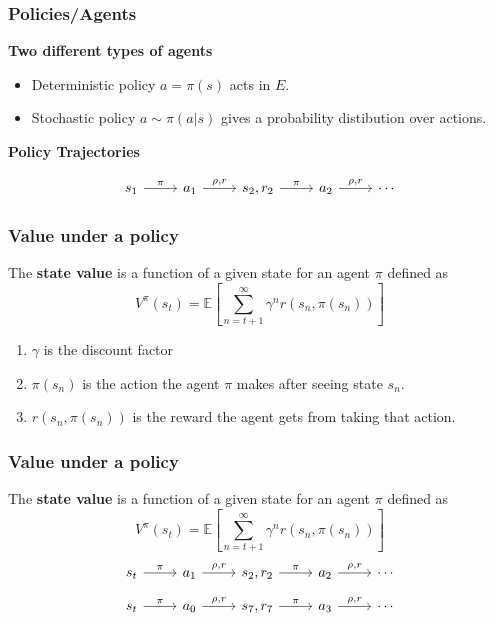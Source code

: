 \begin{frame}[fragile]
  \frametitle{Policies/Agents}
\textbf{Two different types of agents}
    \begin{itemize}
    \item Deterministic policy $a = \pi(s)$ acts in $E$. 
    \item Stochastic policy $a \sim \pi(a | s)$ gives a probability distibution over actions.
    \end{itemize}

\textbf{Policy Trajectories}
    
    \begin{equation*}
      \begin{tikzcd}
          s_1 \arrow{r}{\pi} & a_1 \arrow{r}{\rho, r} & s_2, r_2 \arrow{r}{\pi}& a_2  \arrow{r}{\rho, r} & \cdots
         \end{tikzcd}   
    \end{equation*}
\end{frame}




\begin{frame}
\frametitle{Value under a policy}
  The \textbf{state value} is a function of a given state for an agent $\pi$ defined as 
  \begin{equation*}
    V^\pi(s_t) = \mathbb{E}\left[\sum_{n={t+1}}^\infty \gamma^n r(s_n, \pi(s_n))\right]
  \end{equation*} 
  \begin{enumerate}
    \item $\gamma$ is the discount factor
    \item $\pi(s_n)$ is the action the agent $\pi$ makes after seeing state $s_n$.
    \item $r(s_n, \pi(s_n))$ is the reward the agent gets from taking that action.
  \end{enumerate}
\end{frame}


\begin{frame}[fragile]
\frametitle{Value under a policy}
  The \textbf{state value} is a function of a given state for an agent $\pi$ defined as 
  \begin{equation*}
    V^\pi(s_t) = \mathbb{E}\left[\sum_{n={t+1}}^\infty \gamma^n r(s_n, \pi(s_n))\right]
  \end{equation*} 
    \begin{equation*}
      \begin{tikzcd}
          s_t \arrow{r}{\pi} & a_1 \arrow{r}{\rho, r} & s_2, r_2 \arrow{r}{\pi}& a_2  \arrow{r}{\rho, r} & \cdots
         \end{tikzcd}    
    \end{equation*}
  \begin{equation*}
        \begin{tikzcd}
        s_t \arrow{r}{\pi} & a_0 \arrow{r}{\rho, r} & s_7, r_7 \arrow{r}{\pi}& a_3  \arrow{r}{\rho, r} & \cdots
       \end{tikzcd} 
  \end{equation*}
\end{frame}



